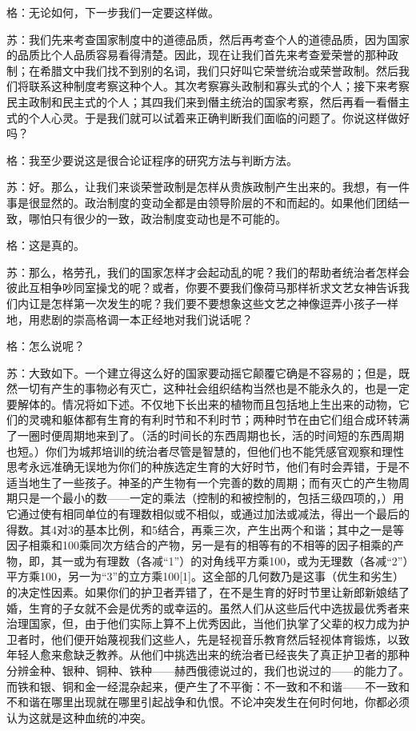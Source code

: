 \documentclass[12pt,oneside]{book}
\begin{document}
格：无论如何，下一步我们一定要这样做。

苏：我们先来考查国家制度中的道德品质，然后再考查个人的道德品质，因为国家的品质比个人品质容易看得清楚。因此，现在让我们首先来考查爱荣誉的那种政制；在希腊文中我们找不到别的名词，我们只好叫它荣誉统治或荣誉政制。然后我们将联系这种制度考察这种个人。其次考察寡头政制和寡头式的个人；接下来考察民主政制和民主式的个人；其四我们来到僭主统治的国家考察，然后再看一看僭主式的个人心灵。于是我们就可以试着来正确判断我们面临的问题了。你说这样做好吗？

格：我至少要说这是很合论证程序的研究方法与判断方法。

苏：好。那么，让我们来谈荣誉政制是怎样从贵族政制产生出来的。我想，有一件事是很显然的。政治制度的变动全都是由领导阶层的不和而起的。如果他们团结一致，哪怕只有很少的一致，政治制度变动也是不可能的。

格：这是真的。

苏：那么，格劳孔，我们的国家怎样才会起动乱的呢？我们的帮助者统治者怎样会彼此互相争吵同室操戈的呢？或者，你要不要我们像荷马那样祈求文艺女神告诉我们内讧是怎样第一次发生的呢？我们要不要想象这些文艺之神像逗弄小孩子一样地，用悲剧的崇高格调一本正经地对我们说话呢？

格：怎么说呢？

苏：大致如下。一个建立得这么好的国家要动摇它颠覆它确是不容易的；但是，既然一切有产生的事物必有灭亡，这种社会组织结构当然也是不能永久的，也是一定要解体的。情况将如下述。不仅地下长出来的植物而且包括地上生出来的动物，它们的灵魂和躯体都有生育的有利时节和不利时节；两种时节在由它们组合成环转满了一圈时便周期地来到了。（活的时间长的东西周期也长，活的时间短的东西周期也短。）你们为城邦培训的统治者尽管是智慧的，但他们也不能凭感官观察和理性思考永远准确无误地为你们的种族选定生育的大好时节，他们有时会弄错，于是不适当地生了一些孩子。神圣的产生物有一个完善的数的周期；而有灭亡的产生物周期只是一个最小的数——一定的乘法（控制的和被控制的，包括三级四项的，）用它通过使有相同单位的有理数相似或不相似，或通过加法或减法，得出一个最后的得数。其4对3的基本比例，和5结合，再乘三次，产生出两个和谐；其中之一是等因子相乘和100乘同次方结合的产物，另一是有的相等有的不相等的因子相乘的产物，即，其一或为有理数（各减“1”）的对角线平方乘100，或为无理数（各减“2”）平方乘100，另一为“3”的立方乘100[1]。这全部的几何数乃是这事（优生和劣生）的决定性因素。如果你们的护卫者弄错了，在不是生育的好时节里让新郎新娘结了婚，生育的子女就不会是优秀的或幸运的。虽然人们从这些后代中选拔最优秀者来治理国家，但，由于他们实际上算不上优秀因此，当他们执掌了父辈的权力成为护卫者时，他们便开始蔑视我们这些人，先是轻视音乐教育然后轻视体育锻炼，以致年轻人愈来愈缺乏教养。从他们中挑选出来的统治者已经丧失了真正护卫者的那种分辨金种、银种、铜种、铁种——赫西俄德说过的，我们也说过的——的能力了。而铁和银、铜和金一经混杂起来，便产生了不平衡：不一致和不和谐——不一致和不和谐在哪里出现就在哪里引起战争和仇恨。不论冲突发生在何时何地，你都必须认为这就是这种血统的冲突。
\end{document}
